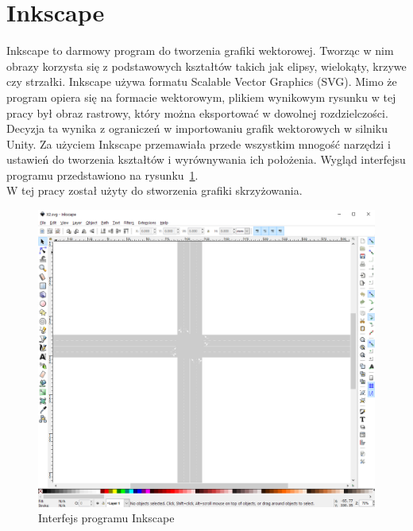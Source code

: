\section*{Inkscape}
Inkscape to darmowy program do tworzenia grafiki wektorowej. Tworząc w nim obrazy korzysta się z podstawowych kształtów takich jak elipsy, wielokąty, krzywe czy strzałki. Inkscape używa formatu Scalable Vector Graphics (SVG). Mimo że program opiera się na formacie wektorowym, plikiem wynikowym rysunku w tej pracy był obraz rastrowy, który można eksportować w dowolnej rozdzielczości. Decyzja ta wynika z ograniczeń w importowaniu grafik wektorowych w silniku Unity. Za użyciem Inkscape przemawiała przede wszystkim mnogość narzędzi i ustawień do tworzenia kształtów i wyrównywania ich położenia. Wygląd interfejsu programu przedstawiono na rysunku~\ref{fig:inkscape}. \\
W tej pracy został użyty do stworzenia grafiki skrzyżowania.
\begin{figure}
	\centering
	\includegraphics[width=1.0\linewidth]{inkscape}
	\caption[Interfejs programu Inkscape]{Interfejs programu Inkscape}
	\label{fig:inkscape}
\end{figure}
